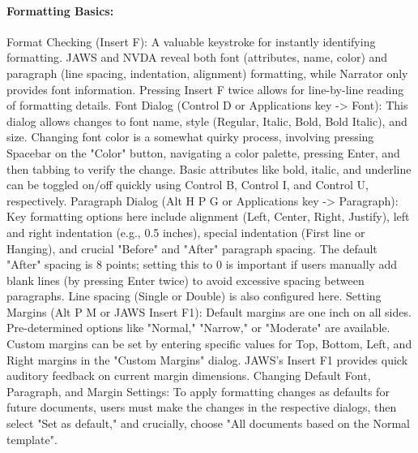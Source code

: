 \paragraph{Formatting Basics:}
Format Checking (Insert F): A valuable keystroke for instantly identifying formatting. JAWS and NVDA reveal both font (attributes, name, color) and paragraph (line spacing, indentation, alignment) formatting, while Narrator only provides font information. Pressing Insert F twice allows for line-by-line reading of formatting details.\supercite{kingsbury2025}
Font Dialog (Control D or Applications key -\textgreater{} Font): This dialog allows changes to font name, style (Regular, Italic, Bold, Bold Italic), and size.\supercite{kingsbury2025} Changing font color is a somewhat quirky process, involving pressing Spacebar on the "Color" button, navigating a color palette, pressing Enter, and then tabbing to verify the change.\supercite{kingsbury2025} Basic attributes like bold, italic, and underline can be toggled on/off quickly using Control B, Control I, and Control U, respectively.\supercite{kingsbury2025}
Paragraph Dialog (Alt H P G or Applications key -\textgreater{} Paragraph): Key formatting options here include alignment (Left, Center, Right, Justify), left and right indentation (e.g., 0.5 inches), special indentation (First line or Hanging), and crucial "Before" and "After" paragraph spacing.\supercite{kingsbury2025} The default "After" spacing is 8 points; setting this to 0 is important if users manually add blank lines (by pressing Enter twice) to avoid excessive spacing between paragraphs.\supercite{kingsbury2025} Line spacing (Single or Double) is also configured here.\supercite{kingsbury2025}
Setting Margins (Alt P M or JAWS Insert F1): Default margins are one inch on all sides.\supercite{kingsbury2025} Pre-determined options like "Normal," "Narrow," or "Moderate" are available. Custom margins can be set by entering specific values for Top, Bottom, Left, and Right margins in the "Custom Margins" dialog.\supercite{kingsbury2025} JAWS's Insert F1 provides quick auditory feedback on current margin dimensions.\supercite{kingsbury2025}
Changing Default Font, Paragraph, and Margin Settings: To apply formatting changes as defaults for future documents, users must make the changes in the respective dialogs, then select "Set as default," and crucially, choose "All documents based on the Normal template".\supercite{kingsbury2025}
